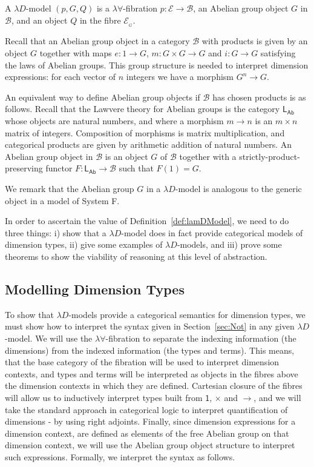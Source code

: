 \documentclass[a4paper,UKenglish]{lipics}
\newcommand{\SystemF}{System F\xspace}
\newcommand{\msf}[1]{\mathsf{#1}} %
\newcommand{\LAb}{\msf{L}_{\msf{Ab}}}
\newcommand{\B}{\mathcal{B}}
\newcommand{\E}{\mathcal{E}}
\newcommand{\fibreE}[1]{\E_{_{#1}}}
\newcommand{\unitTy}{\msf{1}}
\begin{document}
\begin{definition}\label{def:lamDModel}
A $\lambda D$-model $(p,G, Q)$ is a $\lambda \forall$-fibration $p:\E\to \B$, an Abelian group object $G$ in $\B$, and an object $Q$ in the fibre $\fibreE{G}$.
\end{definition}

Recall that an Abelian group object in a category $\B$ with products is given by an object $G$ together with maps $e:1\to G$, $m:G\times G\to G$ and $i:G\to G$ satisfying the laws of Abelian groups. This group structure is needed to interpret dimension expressions: for each vector of $n$ integers we have a morphism $G^n\to G$.

An equivalent way to define Abelian group objects if $\B$ has chosen products is as follows. Recall that the Lawvere theory for Abelian groups is the category $\LAb$ whose objects are natural numbers, and where a morphism $m\to n$ is an $m\times n$ matrix of integers. Composition of morphisms is matrix multiplication, and categorical products are given by arithmetic addition of natural numbers. An Abelian group object in $\B$ is an object $G$ of $\B$ together with a strictly-product-preserving functor $F:\LAb\to\B$ such that $F(1)=G$.

We remark that the Abelian group $G$ in a $\lambda D$-model is analogous to the generic object in a model of \SystemF.

In order to ascertain the value of Definition~\ref{def:lamDModel}, we
need to do three things: i) show that a $\lambda D$-model does in fact provide categorical models of dimension types, ii) give some examples of $\lambda D$-models, and iii) prove some theorems to show the viability of reasoning at this level of abstraction.\\




\subsection{Modelling Dimension Types}
To show that $\lambda D$-models provide a categorical semantics for dimension types, we must show how to interpret the syntax given in Section~\ref{sec:Not} in any given $\lambda D$-model. We will use the $\lambda \forall$-fibration to separate the indexing information (the dimensions) from the indexed information (the types and terms). This means, that the base category of the fibration will be used to interpret dimension contexts, and types and terms will be interpreted as objects in the fibres above the dimension contexts in which they are defined. Cartesian closure of the fibres will allow us to inductively interpret types built from $\unitTy$, $\times$ and $\rightarrow$, and we will take the standard approach in categorical logic to interpret quantification of dimensions - by using right adjoints. Finally, since dimension expressions for a dimension context, are defined as elements of the free Abelian group on that dimension context, we will use the Abelian group object structure to interpret such
expressions. Formally, we interpret the
syntax as follows.
\end{document}
